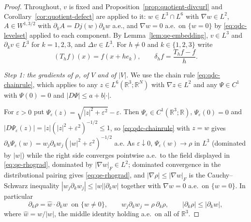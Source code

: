 \documentclass[11pt]{article}
\theoremstyle{definition}
\theoremstyle{plain}
\newcommand{\R}{\mathbb R}
\begin{document}
\begin{proof}
Throughout, $v$ is fixed and Proposition~\ref{prop:quotient-divcurl} and
Corollary~\ref{cor:quotient-defect} are applied to it: $w\in L^3\cap L^6$
with $\nabla w\in L^2$, $A\in W^{1,3/2}$ with
$\partial_kA=Dj(w)\partial_kw$ a.e., and $\nabla w=0$ a.e.\ on $\{w=0\}$ by
\eqref{eq:qdc-levelset} applied to each component.  By
Lemma~\ref{lem:qe-embedding}, $v\in L^3$ and $\partial_kv\in L^3$ for
$k=1,2,3$, and $\Delta v\in L^3$.  For $h\ne0$ and $k\in\{1,2,3\}$ write
\[
 (T_hf)(x)=f(x+he_k),\qquad \delta_hf=\frac{T_hf-f}h .
\]

\emph{Step 1: the gradients of $\rho$, of $V$ and of $|V|$.}  We use the
chain rule \eqref{eq:qdc-chainrule}, which applies to any
$z\in L^6(\R^3;\R^N)$ with $\nabla z\in L^2$ and any $\Psi\in C^1$ with
$\Psi(0)=0$ and $|D\Psi|\le a+b|\cdot|$.

For $\varepsilon>0$ put $\Psi_\varepsilon(z)=\sqrt{|z|^2+\varepsilon^2}-\varepsilon$.
Then $\Psi_\varepsilon\in C^1(\R^3;\R)$, $\Psi_\varepsilon(0)=0$ and
$|D\Psi_\varepsilon(z)|=|z|(|z|^2+\varepsilon^2)^{-1/2}\le1$, so
\eqref{eq:qdc-chainrule} with $z=w$ gives
$\partial_k\Psi_\varepsilon(w)=w_j\partial_kw_j(|w|^2+\varepsilon^2)^{-1/2}$
a.e.  As $\varepsilon\downarrow0$, $\Psi_\varepsilon(w)\to\rho$ in
$L^3$ (dominated by $|w|$) while the right side converges pointwise a.e.\
to the field displayed in \eqref{eq:qe-rhograd}, dominated by
$|\nabla w|_F\in L^2$; dominated convergence in the distributional pairing
gives \eqref{eq:qe-rhograd}, and $|\nabla\rho|\le|\nabla w|_F$ is the
Cauchy--Schwarz inequality $|w_j\partial_kw_j|\le|w||\partial_kw|$
together with $\nabla w=0$ a.e.\ on $\{w=0\}$.  In particular
\begin{equation}\label{eq:qe-rhoderiv}
 \partial_k\rho=\widehat w\cdot\partial_kw
 \ \text{ on }\{w\ne0\},
 \qquad
 w_j\partial_kw_j=\rho\,\partial_k\rho,
 \qquad
 |\partial_k\rho|\le|\partial_kw| ,
\end{equation}
where $\widehat w=w/|w|$, the middle identity holding a.e.\ on all of
$\R^3$.


\end{proof}
\end{document}
